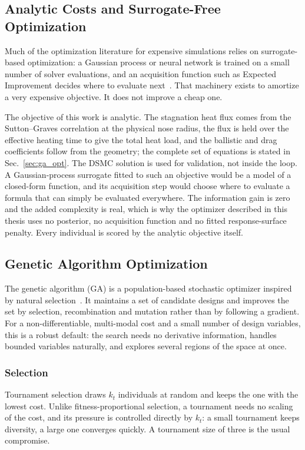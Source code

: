 \subsection{Analytic Costs and Surrogate-Free Optimization}

Much of the optimization literature for expensive simulations relies on surrogate-based optimization: a Gaussian process or neural network is trained on a small number of solver evaluations, and an acquisition function such as Expected Improvement decides where to evaluate next~\cite{rasmussen2003}. That machinery exists to amortize a very expensive objective. It does not improve a cheap one.

The objective of this work is analytic. The stagnation heat flux comes from the Sutton--Graves correlation at the physical nose radius, the flux is held over the effective heating time to give the total heat load, and the ballistic and drag coefficients follow from the geometry; the complete set of equations is stated in Sec.~\ref{sec:ga_opt}. The DSMC solution is used for validation, not inside the loop. A Gaussian-process surrogate fitted to such an objective would be a model of a closed-form function, and its acquisition step would choose where to evaluate a formula that can simply be evaluated everywhere. The information gain is zero and the added complexity is real, which is why the optimizer described in this thesis uses no posterior, no acquisition function and no fitted response-surface penalty. Every individual is scored by the analytic objective itself.

\subsection{Genetic Algorithm Optimization}

The genetic algorithm (GA) is a population-based stochastic optimizer inspired by natural selection~\cite{Goldberg1989}. It maintains a set of candidate designs and improves the set by selection, recombination and mutation rather than by following a gradient. For a non-differentiable, multi-modal cost and a small number of design variables, this is a robust default: the search needs no derivative information, handles bounded variables naturally, and explores several regions of the space at once.

\subsubsection{Selection}
Tournament selection draws $k_t$ individuals at random and keeps the one with the lowest cost. Unlike fitness-proportional selection, a tournament needs no scaling of the cost, and its pressure is controlled directly by $k_t$: a small tournament keeps diversity, a large one converges quickly. A tournament size of three is the usual compromise.


